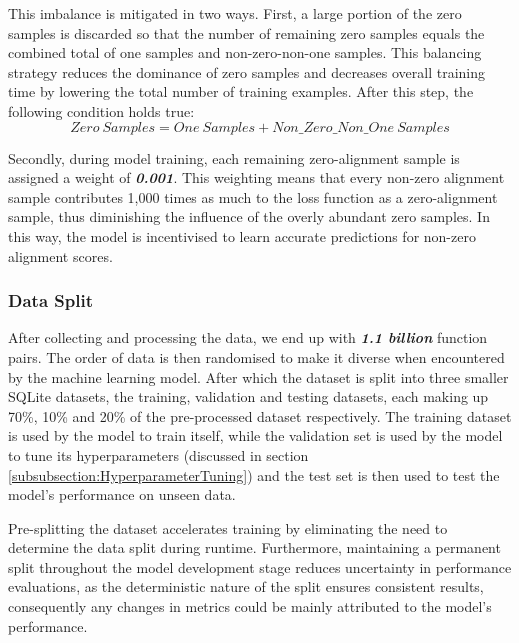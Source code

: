 This imbalance is mitigated in two ways. First, a large portion of the zero samples is discarded so that the number of remaining zero samples equals the combined total of one samples and non-zero-non-one samples. This balancing strategy reduces the dominance of zero samples and decreases overall training time by lowering the total number of training examples. After this step, the following condition holds true:
$$Zero\ Samples = One\ Samples + Non\_Zero\_Non\_One\ Samples$$

Secondly, during model training, each remaining zero-alignment sample is assigned a weight of \textbf{\textit{0.001}}. This weighting means that every non-zero alignment sample contributes 1,000 times as much to the loss function as a zero-alignment sample, thus diminishing the influence of the overly abundant zero samples. In this way, the model is incentivised to learn accurate predictions for non-zero alignment scores.


\subsubsection{Data Split}
After collecting and processing the data, we end up with \textbf{\textit{1.1 billion}} function pairs. The order of data is then randomised to make it diverse when encountered by the machine learning model. After which the dataset is split into three smaller SQLite datasets, the training, validation and testing datasets, each making up 70\%, 10\% and 20\% of the pre-processed dataset respectively. The training dataset is used by the model to train itself, while the validation set is used by the model to tune its hyperparameters (discussed in section \ref{subsubsection:HyperparameterTuning}) and the test set is then used to test the model's performance on unseen data.

Pre-splitting the dataset accelerates training by eliminating the need to determine the data split during runtime. Furthermore, maintaining a permanent split throughout the model development stage reduces uncertainty in performance evaluations, as the deterministic nature of the split ensures consistent results, consequently any changes in metrics could be mainly attributed to the model's performance.

